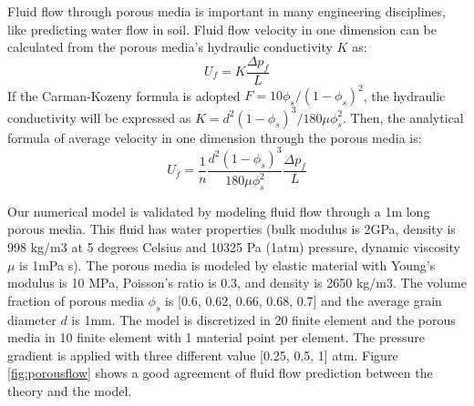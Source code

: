 \documentclass[preprint,12pt]{elsarticle}
\begin{document}
%
%
Fluid flow through porous media is important in many engineering disciplines, like predicting water flow in soil. Fluid flow velocity in one dimension can be calculated from the porous media's hydraulic conductivity $K$ as:\\
%
%
\begin{equation}
  {U}_f   = K \frac{\Delta p_f}{L}
\end {equation}
%
%
If the Carman-Kozeny formula is adopted $F = 10\phi_s/(1-\phi_s)^2$, the hydraulic conductivity will be expressed as  $K = d^2 (1-\phi_s)^3 / 180 \mu \phi_s^2$. Then, the analytical formula of average velocity in one dimension through the porous media is:\\
%
%
\begin{equation}
  {U}_f  = \frac{1}{n} \frac{d^2 (1-\phi_s)^3}{180 \mu \phi_s^2} \frac{\Delta p_f}{L}
\end {equation}

%
%
Our numerical model is validated by modeling fluid flow through a 1m long porous media. This fluid has water properties (bulk modulus is 2GPa, density is 998 kg/m3 at 5 degrees Celsius and 10325 Pa (1atm) pressure, dynamic viscosity $\mu$ is 1mPa s). The porous media is modeled by elastic material with Young's modulus is 10 MPa, Poisson's ratio is 0.3, and density is 2650 kg/m3. The volume fraction of porous media $\phi_s$ is [0.6, 0.62, 0.66, 0.68, 0.7] and the average grain diameter $d$ is 1mm. The model is discretized in 20 finite element and the porous media in 10 finite element with 1 material point per element. The pressure gradient is applied with three different value [0.25, 0.5, 1] atm. Figure \ref{fig:porousflow} shows a good agreement of fluid flow prediction between the theory and the model. \\
%
\end{document}
